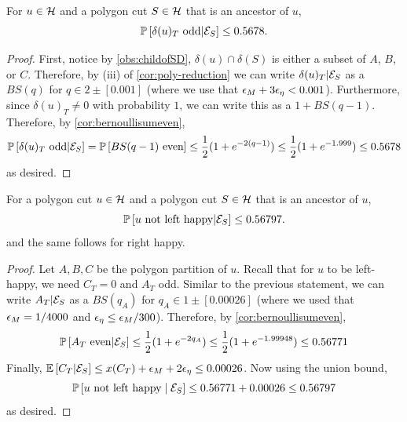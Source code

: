 \begin{corollary}	\label{lem:bottompaymentprob}
For $u\in \mathcal{H}$ and a polygon cut $S\in \mathcal{H}$ that is an ancestor of $u$,
	 $${\mathbb{P}}\left[\delta(u)_T\text{ odd} | {\cal E}_S\right]\leq  0.5678.$$
\end{corollary}
\begin{proof}
First, notice by \cref{obs:childofSD}, $\delta(u)\cap\delta(S)$ is either a subset of $A$, $B$, or $C$. Therefore, by (iii) of \cref{cor:poly-reduction} we can write $\delta(u)_T | {\cal E}_S$ as a $BS(q)$ for $q\in 2\pm [0.001]$ (where we use that ${\epsilon}_M+3{\epsilon}_\eta<0.001$). Furthermore,  since $\delta(u)_T\neq 0$ with probability $1$, we can write this as a $1+BS(q-1)$. 
Therefore, by \cref{cor:bernoullisumeven},
$${\mathbb{P}}\left[\delta(u)_T \text{ odd} | {\cal E}_S\right] = {\mathbb{P}}\left[BS(q-1)\text{ even}\right]\leq \frac12(1+e^{-2(q-1)})\leq \frac12(1+e^{-1.999})\leq 0.5678$$
as desired.
\end{proof}

\begin{corollary}\label{lem:bottompayment-polyprob}
For a polygon cut $u\in \mathcal{H}$  and a polygon cut $S\in \mathcal{H}$ that is an ancestor of $u$,
	 $${\mathbb{P}}\left[u \text{ not left happy} | {\cal E}_S\right]\leq  0.56797.$$
	 and the same follows for right happy. 
\end{corollary}
\begin{proof}
Let $A,B,C$ be the polygon partition of $u$. Recall that for $u$ to be left-happy, we need $C_T=0$ and $A_T$  odd.
Similar to the previous statement, we can write $A_T | {\cal E}_S$ as a $BS(q_A)$ for $q_A\in 1\pm [0.00026]$ (where we used that ${\epsilon}_M=1/4000$ and ${\epsilon}_\eta\leq {\epsilon}_M/300$).
 Therefore, by \cref{cor:bernoullisumeven},
$${\mathbb{P}}\left[A_T \text{ even} | {\cal E}_S\right] \leq \frac12(1+e^{-2q_A})\leq  \frac12(1+e^{-1.99948})\leq 0.56771$$
Finally, ${\mathbb{E}}\left[C_T | {\cal E}_S\right]\leq x(C_T)+{\epsilon}_M+2{\epsilon}_\eta \leq 0.00026$. 
Now using the union bound, 
$${\mathbb{P}}\left[u \text{ not left happy} \mid {\cal E}_S\right] \le 0.56771 + 0.00026 \le 0.56797$$
as desired.
\end{proof}

